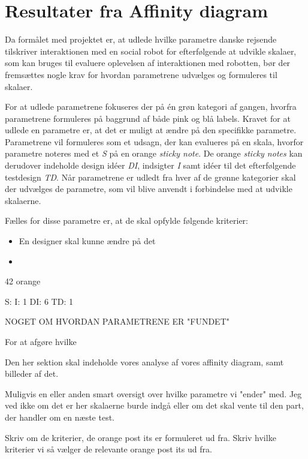 \section{Resultater fra Affinity diagram}
\label{ParametreDatabehandlingAffinityDiagram}
%
Da formålet med projektet er, at udlede hvilke parametre danske rejsende tilskriver interaktionen med en social robot for efterfølgende at udvikle skalaer, som kan bruges til evaluere oplevelsen af interaktionen med robotten, bør der fremsættes nogle krav for hvordan parametrene udvælges og formuleres til skalaer. 

For at udlede parametrene fokuseres der på én grøn kategori af gangen, hvorfra parametrene formuleres på baggrund af både pink og blå labels. Kravet for at udlede en parametre er, at det er muligt at ændre på den specifikke parametre. Parametrene vil formuleres som et udsagn, der kan evalueres på en skala, hvorfor parametre noteres med et \textit{S} på en orange \textit{sticky note}. De orange \textit{sticky notes} kan derudover indeholde design idéer \textit{DI}, indsigter \textit{I} samt idéer til det efterfølgende testdesign \textit{TD}. Når parametrene er udledt fra hver af de grønne kategorier skal der udvælges de parametre, som vil blive anvendt i forbindelse med at udvikle skalaerne. 

Fælles for disse parametre er, at de skal opfylde følgende kriterier: \blankline
%
\begin{itemize}
  \item En designer skal kunne ændre på det
  \item 
\end{itemize}
   

 42 orange
 
 S: 
 I: 1
 DI: 6
 TD: 1


NOGET OM HVORDAN PARAMETRENE ER "FUNDET" 

For at afgøre hvilke 

Den her sektion skal indeholde vores analyse af vores affinity diagram, samt billeder af det. 

Muligvis en eller anden smart oversigt over hvilke parametre vi "ender" med. Jeg ved ikke om det er her skalaerne burde indgå eller om det skal vente til den part, der handler om en næste test. 

Skriv om de kriterier, de orange post its er formuleret ud fra. Skriv hvilke kriterier vi så vælger de relevante orange post its ud fra. 

